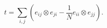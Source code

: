 \begin{equation}
t=\sum_{i,j}(e_{ij}\otimes e_{ji}-\frac1N e_{ii}\otimes e_{jj}).
\label{tform}
\end{equation}

